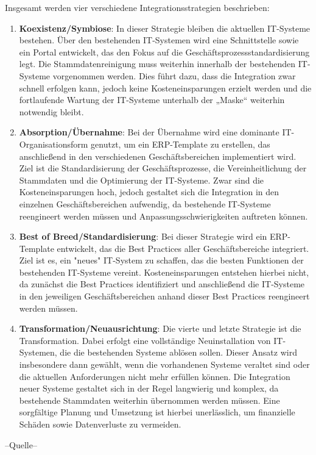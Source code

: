 \documentclass[a4paper,12pt]{article}
\begin{document}
Insgesamt werden vier verschiedene Integrationsstrategien beschrieben:
\begin{enumerate}
    \item \textbf{Koexistenz/Symbiose}: \newline
    In dieser Strategie bleiben die aktuellen IT-Systeme bestehen.
    Über den bestehenden IT-Systemen wird eine Schnittstelle sowie ein Portal entwickelt, das den Fokus auf die Geschäftsprozessstandardisierung legt.
    Die Stammdatenreinigung muss weiterhin innerhalb der bestehenden IT-Systeme vorgenommen werden.
    Dies führt dazu, dass die Integration zwar schnell erfolgen kann, 
    jedoch keine Kosteneinsparungen erzielt werden und die fortlaufende Wartung der IT-Systeme 
    unterhalb der „Maske“ weiterhin notwendig bleibt. \newpage
    \item \textbf{Absorption/Übernahme}:\newline
    Bei der Übernahme wird eine dominante IT-Organisationsform genutzt, um ein ERP-Template zu erstellen,
    das anschließend in den verschiedenen Geschäftsbereichen implementiert wird. Ziel ist die Standardisierung der Geschäftsprozesse,
    die Vereinheitlichung der Stammdaten und die Optimierung der IT-Systeme.
    Zwar sind die Kosteneinsparungen hoch, jedoch gestaltet sich die Integration in den einzelnen Geschäftsbereichen aufwendig,
    da bestehende IT-Systeme reengineert werden müssen und Anpassungsschwierigkeiten auftreten können.
    \item \textbf{Best of Breed/Standardisierung}:\newline
    Bei dieser Strategie wird ein ERP-Template entwickelt, das die Best Practices aller Geschäftsbereiche integriert.
    Ziel ist es, ein "neues" IT-System zu schaffen, das die besten Funktionen der bestehenden IT-Systeme vereint.
    Kosteneinsparungen entstehen hierbei nicht, da zunächst die Best Practices identifiziert und anschließend die IT-Systeme
    in den jeweiligen Geschäftsbereichen anhand dieser Best Practices reengineert werden müssen.
    \item \textbf{Transformation/Neuausrichtung}:\newline
    Die vierte und letzte Strategie ist die Transformation.
    Dabei erfolgt eine vollständige Neuinstallation von IT-Systemen, die die bestehenden Systeme ablösen sollen.
    Dieser Ansatz wird insbesondere dann gewählt, wenn die vorhandenen Systeme veraltet sind oder die aktuellen Anforderungen nicht mehr erfüllen können.
    Die Integration neuer Systeme gestaltet sich in der Regel langwierig und komplex, da bestehende Stammdaten weiterhin übernommen werden müssen.
    Eine sorgfältige Planung und Umsetzung ist hierbei unerlässlich, um finanzielle Schäden sowie Datenverluste zu vermeiden.
\end{enumerate}
--Quelle--
\end{document}
